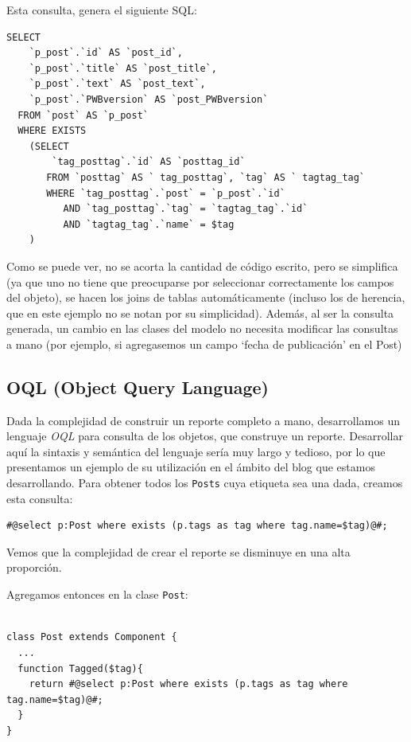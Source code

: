 Esta consulta, genera el siguiente SQL:

\begin{verbatim}
SELECT
    `p_post`.`id` AS `post_id`,
    `p_post`.`title` AS `post_title`,
    `p_post`.`text` AS `post_text`,
    `p_post`.`PWBversion` AS `post_PWBversion`
  FROM `post` AS `p_post`
  WHERE EXISTS
    (SELECT
        `tag_posttag`.`id` AS `posttag_id`
       FROM `posttag` AS ` tag_posttag`, `tag` AS ` tagtag_tag`
       WHERE `tag_posttag`.`post` = `p_post`.`id`
          AND `tag_posttag`.`tag` = `tagtag_tag`.`id`
          AND `tagtag_tag`.`name` = $tag
    )
\end{verbatim}

Como se puede ver, no se acorta la cantidad de código escrito, pero se simplifica (ya que uno no tiene que preocuparse por seleccionar correctamente los campos del objeto), se hacen los joins de tablas automáticamente (incluso los de herencia, que en este ejemplo no se notan por su simplicidad). Además, al ser la consulta generada, un cambio en las clases del modelo no necesita modificar las consultas a mano (por ejemplo, si agregasemos un campo `fecha de publicación' en el Post)

\subsection{OQL (Object Query Language)}
\label{sub-oql}
Dada la complejidad de construir un reporte completo a mano, desarrollamos un lenguaje \emph{OQL} para consulta de los objetos, que construye un reporte. Desarrollar aquí la sintaxis y semántica del lenguaje sería muy largo y tedioso, por lo que presentamos un ejemplo de su utilización en el ámbito del blog que estamos desarrollando. Para obtener todos los \verb"Posts" cuya etiqueta sea una dada, creamos esta consulta:

\begin{verbatim}
#@select p:Post where exists (p.tags as tag where tag.name=$tag)@#;
\end{verbatim}

Vemos que la complejidad de crear el reporte se disminuye en una alta proporción.

Agregamos entonces en la clase \verb"Post":

\begin{verbatim}

class Post extends Component {
  ...
  function Tagged($tag){
    return #@select p:Post where exists (p.tags as tag where tag.name=$tag)@#;
  }
}

\end{verbatim}

